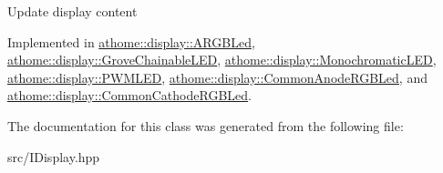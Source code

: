 Update display content 

Implemented in \mbox{\hyperlink{classathome_1_1display_1_1_a_r_g_b_led_a725ceca0c01735daa9c95148baf075ab}{athome\+::display\+::\+A\+R\+G\+B\+Led}}, \mbox{\hyperlink{classathome_1_1display_1_1_grove_chainable_l_e_d_a05a4a1381396b7fc11a24993865d8226}{athome\+::display\+::\+Grove\+Chainable\+L\+ED}}, \mbox{\hyperlink{classathome_1_1display_1_1_monochromatic_l_e_d_aef6a651fdbb24ebb1d0887c1b3e5133d}{athome\+::display\+::\+Monochromatic\+L\+ED}}, \mbox{\hyperlink{classathome_1_1display_1_1_p_w_m_l_e_d_a49a059d9bbd5bf08c0e057f0c957e736}{athome\+::display\+::\+P\+W\+M\+L\+ED}}, \mbox{\hyperlink{classathome_1_1display_1_1_common_anode_r_g_b_led_ab7daf7dcc6ac1e3fcab202cae484b237}{athome\+::display\+::\+Common\+Anode\+R\+G\+B\+Led}}, and \mbox{\hyperlink{classathome_1_1display_1_1_common_cathode_r_g_b_led_ab78ab6aef619d8e0941dd11d4cfbb545}{athome\+::display\+::\+Common\+Cathode\+R\+G\+B\+Led}}.



The documentation for this class was generated from the following file\+:\begin{DoxyCompactItemize}
\item 
src/I\+Display.\+hpp\end{DoxyCompactItemize}
